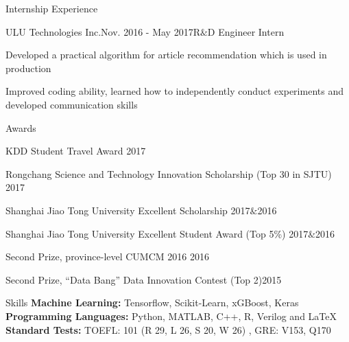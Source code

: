 \documentclass{resume} %
\begin{document}
\begin{rSection}{Internship Experience}
\begin{rSubsection}{ULU Technologies Inc.}{Nov. 2016 - May 2017}{R$\&$D  Engineer Intern}{}
\item Developed a practical algorithm for article recommendation which is used in production
\item Improved coding ability, learned how to independently conduct experiments and developed communication skills
\end{rSubsection}
\end{rSection}



\begin{rSection}{Awards}
\begin{rSubsection}{}{}{}{}
\item KDD Student Travel Award \hfill{2017}
\item Rongchang Science and Technology Innovation Scholarship (Top 30 in SJTU) \hfill{2017}
\item Shanghai Jiao Tong University Excellent Scholarship \hfill{2017$\&$2016}
\item Shanghai Jiao Tong University Excellent Student Award (Top 5\%)  \hfill{2017$\&$2016}
\item Second Prize, province-level CUMCM 2016 \hfill{2016}
\item Second Prize, ``Data Bang'' Data Innovation Contest (Top 2)\hfill{2015} 
\end{rSubsection}
\end{rSection}

\begin{rSection}{Skills}
{\bf Machine Learning: }
\hspace*{3.0 cm} Tensorflow, Scikit-Learn, xGBoost, Keras\\
{\bf Programming Languages: }
\hspace*{1.8 cm} Python, MATLAB, C++, R, Verilog and \LaTeX  \\
{\bf Standard Tests: }
\hspace*{3.4 cm} TOEFL: 101 (R 29, L 26, S 20, W 26) , GRE: V153, Q170
\end{rSection}
\end{document}

